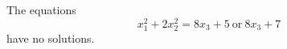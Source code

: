 \begin{proposition}\label{eq:028}
    The equations
\[
    x_1^2+2x_2^2=8x_3+5\ \text{or}\ 8x_3+7
\]
    have no solutions.
\end{proposition}
